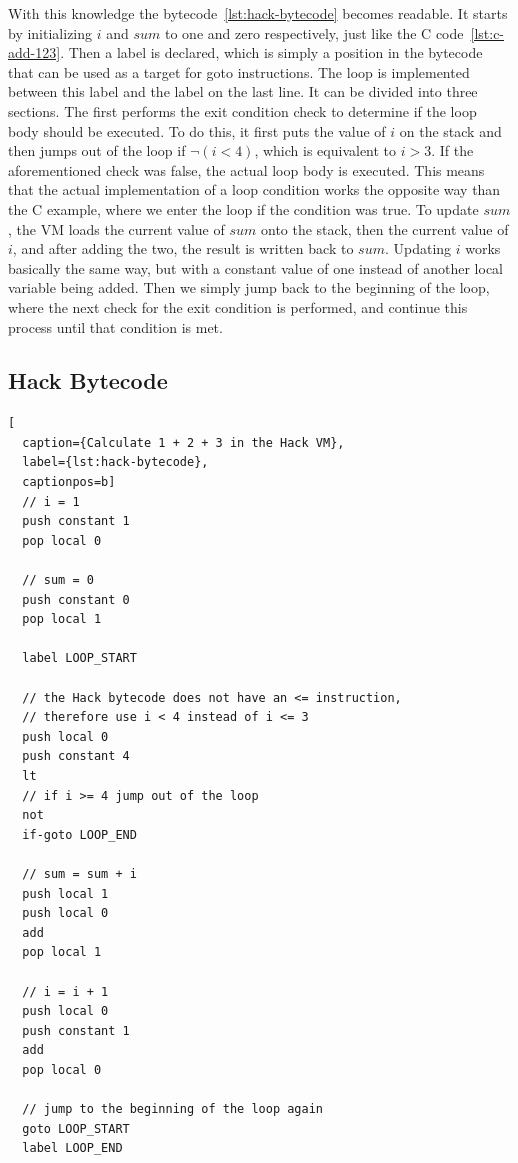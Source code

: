 With this knowledge the bytecode~\ref{lst:hack-bytecode} becomes readable. It starts by initializing \(i\) and \(sum\) to one and zero respectively, just like the C code~\ref{lst:c-add-123}. Then a label is declared, which is simply a position in the bytecode that can be used as a target for goto instructions.
The loop is implemented between this label and the label on the last line.
It can be divided into three sections. The first performs the exit condition check to determine if the loop body should be executed. To do this, it first puts the value of \(i\) on the stack and then jumps out of the loop if \(\neg(i < 4)\), which is equivalent to \(i > 3\). If the aforementioned check was false, the actual loop body is executed. This means that the actual implementation of a loop condition works the opposite way than the C example, where we enter the loop if the condition was true.
To update \(sum\), the VM loads the current value of \(sum\) onto the stack, then the current value of \(i\), and after adding the two, the result is written back to \(sum\).
Updating \(i\) works basically the same way, but with a constant value of one instead of another local variable being added.
Then we simply jump back to the beginning of the loop, where the next check for the exit condition is performed, and continue this process until that condition is met.

\subsection{Hack Bytecode}
\begin{lstlisting}[
  caption={Calculate 1 + 2 + 3 in the Hack VM},
  label={lst:hack-bytecode},
  captionpos=b]
  // i = 1
  push constant 1
  pop local 0

  // sum = 0
  push constant 0
  pop local 1

  label LOOP_START

  // the Hack bytecode does not have an <= instruction,
  // therefore use i < 4 instead of i <= 3
  push local 0
  push constant 4
  lt
  // if i >= 4 jump out of the loop
  not
  if-goto LOOP_END

  // sum = sum + i
  push local 1
  push local 0
  add
  pop local 1

  // i = i + 1
  push local 0
  push constant 1
  add
  pop local 0

  // jump to the beginning of the loop again
  goto LOOP_START
  label LOOP_END
\end{lstlisting}

